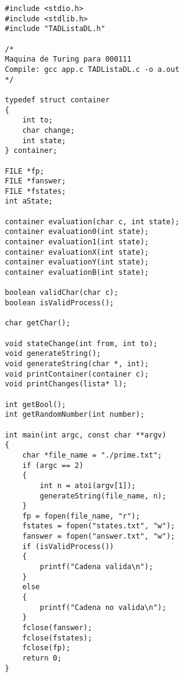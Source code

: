 \documentclass[11pt,a4paper]{report}
\begin{document}
		    \begin{lstlisting}
#include <stdio.h>
#include <stdlib.h>
#include "TADListaDL.h"

/*
Maquina de Turing para 000111
Compile: gcc app.c TADListaDL.c -o a.out
*/

typedef struct container
{
    int to;
    char change;
    int state;
} container;

FILE *fp;
FILE *fanswer;
FILE *fstates;
int aState;

container evaluation(char c, int state);
container evaluation0(int state);
container evaluation1(int state);
container evaluationX(int state);
container evaluationY(int state);
container evaluationB(int state);

boolean validChar(char c);
boolean isValidProcess();

char getChar();

void stateChange(int from, int to);
void generateString();
void generateString(char *, int);
void printContainer(container c);
void printChanges(lista* l);

int getBool();
int getRandomNumber(int number);

int main(int argc, const char **argv)
{
    char *file_name = "./prime.txt";
    if (argc == 2)
    {
        int n = atoi(argv[1]);
        generateString(file_name, n);
    }
    fp = fopen(file_name, "r");
    fstates = fopen("states.txt", "w");
    fanswer = fopen("answer.txt", "w");
    if (isValidProcess())
    {
        printf("Cadena valida\n");
    }
    else
    {
        printf("Cadena no valida\n");
    }
    fclose(fanswer);
    fclose(fstates);
    fclose(fp);
    return 0;
}


\end{lstlisting}
\end{document}
